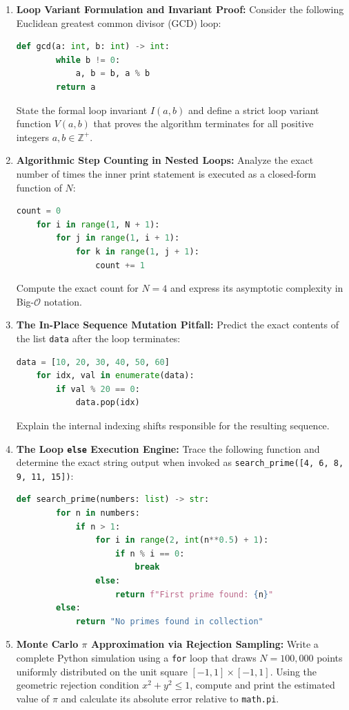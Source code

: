 \begin{enumerate}
    \item \textbf{Loop Variant Formulation and Invariant Proof:}
    Consider the following Euclidean greatest common divisor (GCD) loop:
    \begin{lstlisting}[language=Python]
    def gcd(a: int, b: int) -> int:
        while b != 0:
            a, b = b, a % b
        return a
    \end{lstlisting}
    State the formal loop invariant $I(a, b)$ and define a strict loop variant function $V(a, b)$ that proves the algorithm terminates for all positive integers $a, b \in \mathbb{Z}^+$.

    \item \textbf{Algorithmic Step Counting in Nested Loops:}
    Analyze the exact number of times the inner print statement is executed as a closed-form function of $N$:
    \begin{lstlisting}[language=Python]
    count = 0
    for i in range(1, N + 1):
        for j in range(1, i + 1):
            for k in range(1, j + 1):
                count += 1
    \end{lstlisting}
    Compute the exact count for $N = 4$ and express its asymptotic complexity in Big-$\mathcal{O}$ notation.

    \item \textbf{The In-Place Sequence Mutation Pitfall:}
    Predict the exact contents of the list \texttt{data} after the loop terminates:
    \begin{lstlisting}[language=Python]
    data = [10, 20, 30, 40, 50, 60]
    for idx, val in enumerate(data):
        if val % 20 == 0:
            data.pop(idx)
    \end{lstlisting}
    Explain the internal indexing shifts responsible for the resulting sequence.

    \item \textbf{The Loop \texttt{else} Execution Engine:}
    Trace the following function and determine the exact string output when invoked as \texttt{search\_prime([4, 6, 8, 9, 11, 15])}:
    \begin{lstlisting}[language=Python]
    def search_prime(numbers: list) -> str:
        for n in numbers:
            if n > 1:
                for i in range(2, int(n**0.5) + 1):
                    if n % i == 0:
                        break
                else:
                    return f"First prime found: {n}"
        else:
            return "No primes found in collection"
    \end{lstlisting}

    \item \textbf{Monte Carlo $\pi$ Approximation via Rejection Sampling:}
    Write a complete Python simulation using a \texttt{for} loop that draws $N = 100{,}000$ points uniformly distributed on the unit square $[-1, 1] \times [-1, 1]$. Using the geometric rejection condition $x^2 + y^2 \le 1$, compute and print the estimated value of $\pi$ and calculate its absolute error relative to \texttt{math.pi}.
\end{enumerate}

